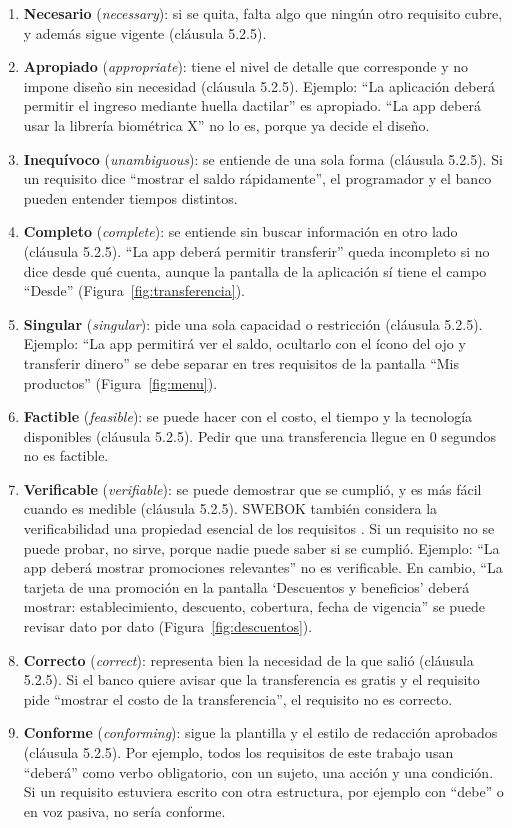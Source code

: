 \documentclass[11pt,a4paper]{article}
\begin{document}
\begin{enumerate}
	\item \textbf{Necesario} (\emph{necessary}): si se quita, falta algo que ningún otro requisito cubre, y además sigue vigente (cláusula 5.2.5).
	\item \textbf{Apropiado} (\emph{appropriate}): tiene el nivel de detalle que corresponde y no impone diseño sin necesidad (cláusula 5.2.5). Ejemplo: “La aplicación deberá permitir el ingreso mediante huella dactilar” es apropiado. “La app deberá usar la librería biométrica X” no lo es, porque ya decide el diseño.
	\item \textbf{Inequívoco} (\emph{unambiguous}): se entiende de una sola forma (cláusula 5.2.5). Si un requisito dice “mostrar el saldo rápidamente”, el programador y el banco pueden entender tiempos distintos.
	\item \textbf{Completo} (\emph{complete}): se entiende sin buscar información en otro lado (cláusula 5.2.5). “La app deberá permitir transferir” queda incompleto si no dice desde qué cuenta, aunque la pantalla de la aplicación sí tiene el campo “Desde” (Figura~\ref{fig:transferencia}).
	\item \textbf{Singular} (\emph{singular}): pide una sola capacidad o restricción (cláusula 5.2.5). Ejemplo: “La app permitirá ver el saldo, ocultarlo con el ícono del ojo y transferir dinero” se debe separar en tres requisitos de la pantalla “Mis productos” (Figura~\ref{fig:menu}).
	\item \textbf{Factible} (\emph{feasible}): se puede hacer con el costo, el tiempo y la tecnología disponibles (cláusula 5.2.5). Pedir que una transferencia llegue en 0 segundos no es factible.
	\item \textbf{Verificable} (\emph{verifiable}): se puede demostrar que se cumplió, y es más fácil cuando es medible (cláusula 5.2.5). SWEBOK también considera la verificabilidad una propiedad esencial de los requisitos \cite{swebok2024}. Si un requisito no se puede probar, no sirve, porque nadie puede saber si se cumplió. Ejemplo: “La app deberá mostrar promociones relevantes” no es verificable. En cambio, “La tarjeta de una promoción en la pantalla ‘Descuentos y beneficios’ deberá mostrar: establecimiento, descuento, cobertura, fecha de vigencia” se puede revisar dato por dato (Figura~\ref{fig:descuentos}).
	\item \textbf{Correcto} (\emph{correct}): representa bien la necesidad de la que salió (cláusula 5.2.5). Si el banco quiere avisar que la transferencia es gratis y el requisito pide “mostrar el costo de la transferencia”, el requisito no es correcto.
	\item \textbf{Conforme} (\emph{conforming}): sigue la plantilla y el estilo de redacción aprobados (cláusula 5.2.5). Por ejemplo, todos los requisitos de este trabajo usan “deberá” como verbo obligatorio, con un sujeto, una acción y una condición. Si un requisito estuviera escrito con otra estructura, por ejemplo con “debe” o en voz pasiva, no sería conforme.
\end{enumerate}
\end{document}
